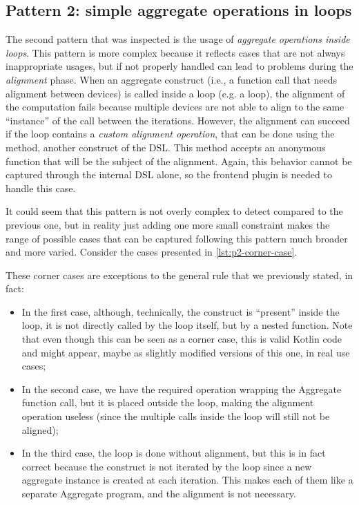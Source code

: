 \documentclass[12pt,a4paper,openright,twoside]{book}
\begin{document}
\subsection{Pattern 2: simple aggregate operations in loops} \label{sec:p2}

The second pattern that was inspected is the usage of \emph{aggregate operations
inside loops}. This pattern is more complex because it reflects cases that are
not always inappropriate usages, but if not properly handled can lead to
problems during the \emph{alignment} phase. 
%
When an aggregate construct (i.e., a function call that needs alignment between
devices) is called inside a loop (e.g. a  loop), the alignment of
the computation fails because multiple devices are not able to align to the same
``instance'' of the call between the iterations. 
%
However, the alignment can succeed if the loop contains a \emph{custom alignment
operation}, that can be done using the  method, another
construct of the \ac{DSL}. This method accepts an anonymous function that will
be the subject of the alignment. 
%
Again, this behavior cannot be captured through the internal \ac{DSL} alone, so
the frontend plugin is needed to handle this case. 

It could seem that this pattern is not overly complex to detect compared to the
previous one, but in reality just adding one more small constraint makes the
range of possible cases that can be captured following this pattern much broader
and more varied. Consider the cases presented in \cref{lst:p2-corner-case}. 

These corner cases are exceptions to the general rule that we previously stated,
in fact:
\begin{itemize}
  \item In the first case, although, technically, the construct is ``present''
  inside the loop, it is not directly called by the loop itself, but by a nested
  function. Note that even though this can be seen as a corner case, this is
  valid Kotlin code and might appear, maybe as slightly modified versions of
  this one, in real use cases;
  \item In the second case, we have the required  operation
  wrapping the Aggregate function call, but it is placed outside the loop,
  making the alignment operation useless (since the multiple calls inside the
  loop will still not be aligned);
  \item In the third case, the loop is done without alignment, but this is in
  fact correct because the construct is not iterated by the loop since a new
  aggregate instance is created at each iteration. This makes each of them
  like a separate Aggregate program, and the alignment is not necessary.
\end{itemize}
\end{document}
